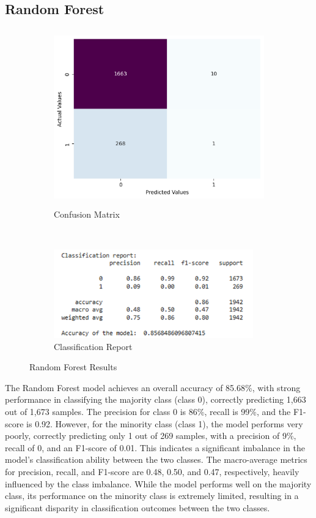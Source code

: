 \documentclass[12pt]{report}
\begin{document}
    \subsection{Random Forest}

    \begin{figure}[h!]
        \centering
        \begin{subfigure}[b]{0.5\textwidth}
            \centering
            \includegraphics[height=3in]{resources/pic/CM Random Forest.png}
            \caption{Confusion Matrix}
            \label{fig:Random Forest Confusion Matrix}
        \end{subfigure}%
        \\
        \begin{subfigure}[b]{0.4\textwidth}
            \centering
            \includegraphics[height=1.5in]{resources/pic/Report Random Forest.png}
            \caption{Classification Report}
            \label{fig:Random Forest Classification Report}
        \end{subfigure}
        \caption{Random Forest Results}
    \end{figure}

    The Random Forest model achieves an overall accuracy of 85.68\%, with strong performance in classifying the majority class (class 0), correctly predicting 1,663 out of 1,673 samples. The precision for class 0 is 86\%, recall is 99\%, and the F1-score is 0.92. However, for the minority class (class 1), the model performs very poorly, correctly predicting only 1 out of 269 samples, with a precision of 9\%, recall of 0, and an F1-score of 0.01. This indicates a significant imbalance in the model's classification ability between the two classes. The macro-average metrics for precision, recall, and F1-score are 0.48, 0.50, and 0.47, respectively, heavily influenced by the class imbalance. While the model performs well on the majority class, its performance on the minority class is extremely limited, resulting in a significant disparity in classification outcomes between the two classes.
\end{document}
